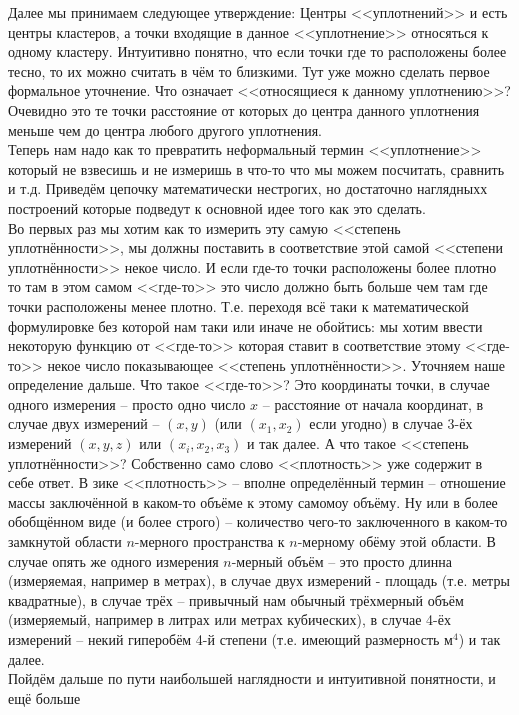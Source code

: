 \documentclass[11pt]{article}
\begin{document}
    Далее мы принимаем следующее утверждение: Центры
<<уплотнений>> и есть центры кластеров, а точки входящие в данное
<<уплотнение>> относяться к одному кластеру. Интуитивно понятно,
что если точки где то расположены более тесно, то их можно считать в чём
то близкими. Тут уже можно сделать первое формальное уточнение. Что
означает <<относящиеся к данному уплотнению>>? Очевидно это те
точки расстояние от которых до центра данного уплотнения меньше чем до
центра любого другого уплотнения. \\ Теперь нам надо как то
превратить неформальный термин <<уплотнение>> который не взвесишь и
не измеришь в что-то что мы можем посчитать, сравнить и т.д. Приведём
цепочку математически нестрогих, но достаточно наглядныхх построений
которые подведут к основной идее того как это сделать.
\\ Во первых раз мы хотим как то измерить эту самую
<<степень уплотнённости>>, мы должны поставить в соответствие этой
самой <<степени уплотнённости>> некое число. И если где-то точки
расположены более плотно то там в этом самом <<где-то>> это число
должно быть больше чем там где точки расположены менее плотно. Т.е.
переходя всё таки к математической формулировке без которой нам таки или
иначе не обойтись: мы хотим ввести некоторую функцию от <<где-то>>
которая ставит в соответствие этому <<где-то>> некое число
показывающее <<степень уплотнённости>>. Уточняем наше определение
дальше. Что такое <<где-то>>? Это координаты точки, в случае одного
измерения -- просто одно число $x$ -- расстояние от начала координат, в
случае двух измерений -- $(x, y)$ (или $(x_1, x_2)$ если угодно) в случае
3-ёх измерений $(x, y, z)$ или $(x_i, x_2, x_3)$ и так далее. А что
такое <<степень уплотнённости>>? Собственно само слово
<<плотность>> уже содержит в себе ответ. В зике
<<плотность>> -- вполне определённый термин -- отношение массы
заключённой в каком-то объёме к этому самомоу объёму. Ну или в более
обобщённом виде (и более строго) -- количество чего-то заключенного в
каком-то замкнутой области $n$-мерного пространства к $n$-мерному обёму
этой области. В случае опять же одного измерения $n$-мерный объём -- это
просто длинна (измеряемая, например в метрах), в случае двух измерений -
площадь (т.е. метры квадратные), в случае трёх -- привычный нам обычный
трёхмерный объём (измеряемый, например в литрах или метрах кубических),
в случае 4-ёх измерений -- некий гиперобём 4-й степени (т.е. имеющий
размерность ${\mbox{м}}^4$) и так далее. \\ Пойдём дальше
по пути наибольшей наглядности и интуитивной понятности, и ещё больше
\end{document}
